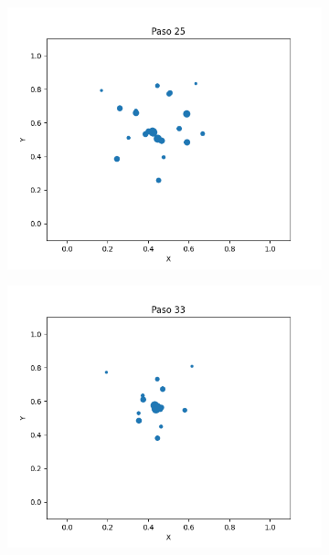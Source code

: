 \documentclass{report}
\begin{document}
\begin{figure}[h]
\begin{subfigure}[b]{0.3\textwidth}
         \includegraphics[width=\textwidth]{Images/Images_m/p9pm_t25.png}
     \end{subfigure}
     \begin{subfigure}[b]{0.3\textwidth}
         \centering
         \includegraphics[width=\textwidth]{Images/Images_m/p9pm_t33.png}
     \end{subfigure}
          \begin{subfigure}[b]{0.3\textwidth}
         \centering

\end{subfigure}
\end{figure}
\end{document}
